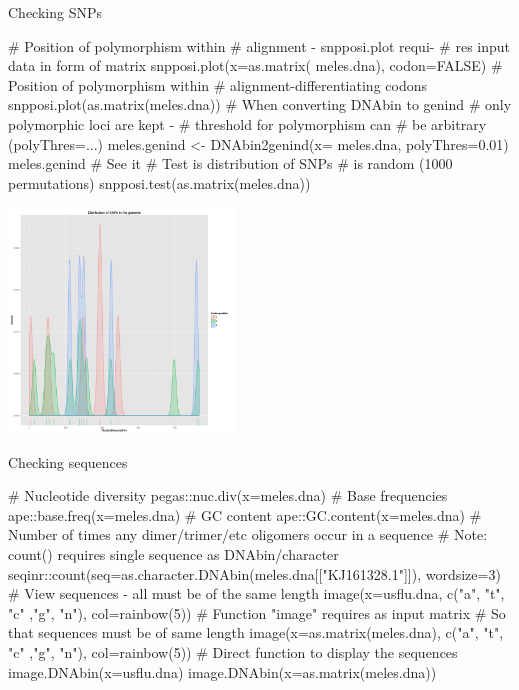 \documentclass[compress, ucs, xelatex, 11pt, xcolor=svgnames,
	hyperref={
		bookmarks=true,
		unicode=true,
		colorlinks=true,
		pdftitle={Molecular data in R},
		plainpages=false,
		pdfauthor={Vojtech Zeisek},
		pdfsubject={Course about phylogeny and evolution in R},
		pdfcreator={XeLaTeX},
		pdfkeywords={R, evolution, phylogeny, molecular data},
		linkcolor=Tomato,
		anchorcolor=SaddleBrown,
		citecolor=Goldenrod,
		filecolor=DarkMagenta,
		menucolor=Sienna,
		urlcolor=DarkTurquoise,
		pdftex},
	url={hyphens, lowtilde} %
	]{beamer}
\begin{document}
\begin{frame}[fragile]{Checking SNPs}
	\begin{multicols}{2}
		\begin{spluscode}
    # Position of polymorphism within
    # alignment - snpposi.plot requi-
    # res input data in form of matrix
    snpposi.plot(x=as.matrix(
      meles.dna), codon=FALSE)
    # Position of polymorphism within
    # alignment-differentiating codons
    snpposi.plot(as.matrix(meles.dna))
    # When converting DNAbin to genind
    # only polymorphic loci are kept -
    # threshold for polymorphism can
    # be arbitrary (polyThres=...)
    meles.genind <- DNAbin2genind(x=
      meles.dna, polyThres=0.01)
    meles.genind # See it
    # Test is distribution of SNPs
    # is random (1000 permutations)
    snpposi.test(as.matrix(meles.dna))
		\end{spluscode}
		\begin{flushright}
			\includegraphics[height=6cm]{snpposi.png}
		\end{flushright}
	\end{multicols}
\end{frame}

\begin{frame}[fragile]{Checking sequences}
	\begin{spluscode}
    # Nucleotide diversity
    pegas::nuc.div(x=meles.dna)
    # Base frequencies
    ape::base.freq(x=meles.dna)
    # GC content
    ape::GC.content(x=meles.dna)
    # Number of times any dimer/trimer/etc oligomers occur in a sequence
    # Note: count() requires single sequence as DNAbin/character
    seqinr::count(seq=as.character.DNAbin(meles.dna[["KJ161328.1"]]),
      wordsize=3)
    # View sequences - all must be of the same length
    image(x=usflu.dna, c("a", "t", "c" ,"g", "n"), col=rainbow(5))
    # Function "image" requires as input matrix
    # So that sequences must be of same length
    image(x=as.matrix(meles.dna), c("a", "t", "c" ,"g", "n"),
      col=rainbow(5))
    # Direct function to display the sequences
    image.DNAbin(x=usflu.dna)
    image.DNAbin(x=as.matrix(meles.dna))
	\end{spluscode}
\end{frame}
\end{document}
